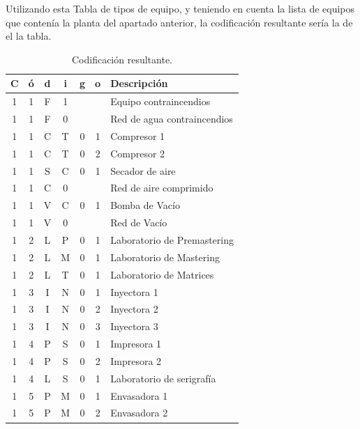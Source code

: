 Utilizando esta Tabla de tipos de equipo, y teniendo en cuenta la lista
de equipos que contenía la planta del apartado anterior, la codificación resultante sería la de el la tabla.

\begin{table}[ht]
    \centering
    \begin{tabular}{|c|c|c|c|c|c|l|}\hline
C&ó&d&i&g&o&Descripción\\\hline
1&1&F&1& & &Equipo contraincendios \\
1&1&F&0& & &Red de agua contraincendios\\
1&1&C&T&0&1&Compresor 1\\
1&1&C&T&0&2&Compresor 2\\
1&1&S&C&0&1&Secador de aire\\
1&1&C&0& & &Red de aire comprimido\\
1&1&V&C&0&1&Bomba de Vacío\\
1&1&V&0& & &Red de Vacío\\
1&2&L&P&0&1&Laboratorio de Premastering\\
1&2&L&M&0&1&Laboratorio de Mastering\\
1&2&L&T&0&1&Laboratorio de Matrices\\
1&3&I&N&0&1&Inyectora 1\\
1&3&I&N&0&2&Inyectora 2\\
1&3&I&N&0&3&Inyectora 3\\
1&4&P&S&0&1&Impresora 1\\
1&4&P&S&0&2&Impresora 2\\
1&4&L&S&0&1&Laboratorio de serigrafía\\
1&5&P&M&0&1&Envasadora 1\\
1&5&P&M&0&2&Envasadora 2\\
\hline
    \end{tabular}
    \caption{Codificación resultante.}

\end{table}

\clearpage
\newpage

